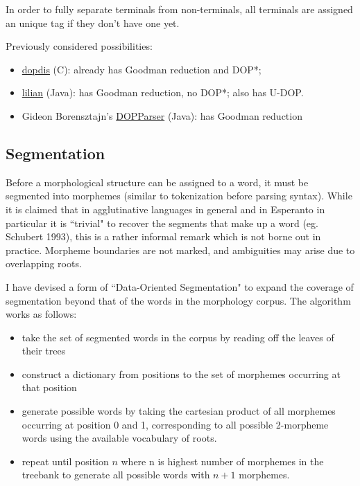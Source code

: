 \documentclass[10pt,a4paper]{article}
\begin{document}
\vspace{2em}
In order to fully separate terminals from non-terminals, all terminals are
assigned an unique tag if they don't have one yet.

Previously considered possibilities:

\begin{itemize}
\item \href{http://staff.science.uva.nl/~simaan/dopdis/}{dopdis} (C): already
has Goodman reduction and DOP*;
\item \href{http://sourceforge.net/projects/lilian/}{lilian} (Java): has
Goodman reduction, no DOP*; also has U-DOP.
\item Gideon Borensztajn's \href{http://staff.science.uva.nl/~gideon/sourcecode/DOPParser.tar.gz}{DOPParser} (Java): has Goodman reduction
\end{itemize}

\subsection{Segmentation}

Before a morphological structure can be assigned to a word, it must be
segmented into morphemes (similar to tokenization before parsing syntax). While
it is claimed that in agglutinative languages in general and in Esperanto in
particular it is ``trivial" to recover the segments that make up a word (eg.
Schubert 1993), this is a rather informal remark which is not borne out in
practice.  Morpheme boundaries are not marked, and ambiguities may arise due to
overlapping roots.

I have devised a form of ``Data-Oriented Segmentation" to expand the
coverage of segmentation beyond that of the words in the morphology corpus. The
algorithm works as follows:

\begin{itemize}
\item take the set of segmented words in the corpus by reading off the leaves
of their trees

\item construct a dictionary from positions to the set of morphemes occurring
at that position

\item generate possible words by taking the cartesian product of all morphemes
occurring at position 0 and 1, corresponding to all possible 2-morpheme words
using the available vocabulary of roots.

\item repeat until position $n$ where n is highest number of morphemes in the
treebank to generate all possible words with $n+1$ morphemes.

\end{itemize}
\end{document}
